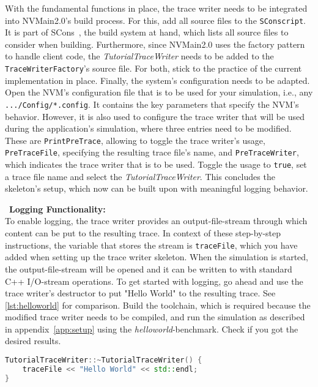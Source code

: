 With the fundamental functions in place, the trace writer needs to be integrated into NVMain2.0's build process. For this, add all source files to the \texttt{SConscript}. It is part of SCons~\cite{scons}, the build system at hand, which lists all source files to consider when building. Furthermore, since NVMain2.0 uses the factory pattern~\cite{ellis:2007} to handle client code, the \emph{TutorialTraceWriter} needs to be added to the \texttt{TraceWriterFactory}'s source file. For both, stick to the practice of the current implementation in place. Finally, the system's configuration needs to be adapted. Open the NVM's configuration file that is to be used for your simulation, i.e., any \texttt{.../Config/*.config}. It contains the key parameters that specify the NVM's behavior. However, it is also used to configure the trace writer that will be used during the application's simulation, where three entries need to be modified. These are \texttt{PrintPreTrace}, allowing to toggle the trace writer's usage, \texttt{PreTraceFile}, specifying the resulting trace file's name, and \texttt{PreTraceWriter}, which indicates the trace writer that is to be used. Toggle the usage to \texttt{true}, set a trace file name and select the \emph{TutorialTraceWriter}. This concludes the skeleton's setup, which now can be built upon with meaningful logging behavior.


~\noindent \textbf{Logging Functionality:}\\
To enable logging, the trace writer provides an output-file-stream through which content can be put to the resulting trace. In context of these step-by-step instructions, the variable that stores the stream is \texttt{traceFile}, which you have added when setting up the trace writer skeleton. When the simulation is started, the output-file-stream will be opened and it can be written to with standard C++ I/O-stream operations. To get started with logging, go ahead and use the trace writer's destructor to put "Hello World" to the resulting trace. See \cref{lst:helloworld} for comparison. Build the toolchain, which is required because the modified trace writer needs to be compiled, and run the simulation as described in appendix~\cref{app:setup} using the \emph{helloworld}-benchmark. Check if you got the desired results.
\begin{lstlisting}[caption={Hello World},label=lst:helloworld,language=c++,basicstyle=\ttfamily\scriptsize]
TutorialTraceWriter::~TutorialTraceWriter() {
    traceFile << "Hello World" << std::endl;
}
\end{lstlisting}

